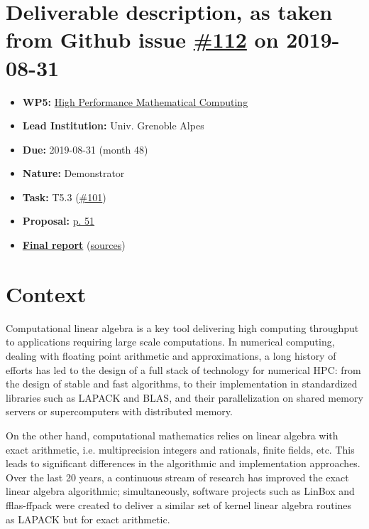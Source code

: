 \hypertarget{deliverable-description-as-taken-from-github-issue-112-on-2019-08-31}{%
\section*{\texorpdfstring{Deliverable description, as taken from Github
issue
\href{https://github.com/OpenDreamKit/OpenDreamKit/issues/112}{\#112} on
2019-08-31}{Deliverable description, as taken from Github issue \#112 on 2019-08-31}}\label{deliverable-description-as-taken-from-github-issue-112-on-2019-08-31}}

\begin{itemize}
\tightlist
\item
  \textbf{WP5:}
  \href{https://github.com/OpenDreamKit/OpenDreamKit/tree/master/WP5}{High
  Performance Mathematical Computing}
\item
  \textbf{Lead Institution:} Univ. Grenoble Alpes
\item
  \textbf{Due:} 2019-08-31 (month 48)
\item
  \textbf{Nature:} Demonstrator
\item
  \textbf{Task:} T5.3
  (\href{https://github.com/OpenDreamKit/OpenDreamKit/issues/101}{\#101})
\item
  \textbf{Proposal:}
  \href{https://github.com/OpenDreamKit/OpenDreamKit/raw/master/Proposal/proposal-www.pdf}{p.
  51}
\item
  \textbf{\href{https://github.com/OpenDreamKit/OpenDreamKit/raw/master/WP5/D5.14/report-final.pdf}{Final
  report}}
  (\href{https://github.com/OpenDreamKit/OpenDreamKit/raw/master/WP5/D5.14/}{sources})
\end{itemize}

\hypertarget{context}{%
\section*{Context}\label{context}}

Computational linear algebra is a key tool delivering high computing
throughput to applications requiring large scale computations. In
numerical computing, dealing with floating point arithmetic and
approximations, a long history of efforts has led to the design of a
full stack of technology for numerical HPC: from the design of stable
and fast algorithms, to their implementation in standardized libraries
such as LAPACK and BLAS, and their parallelization on shared memory
servers or supercomputers with distributed memory.

On the other hand, computational mathematics relies on linear algebra
with exact arithmetic, i.e. multiprecision integers and rationals,
finite fields, etc. This leads to significant differences in the
algorithmic and implementation approaches. Over the last 20 years, a
continuous stream of research has improved the exact linear algebra
algorithmic; simultaneously, software projects such as LinBox and
fflas-ffpack were created to deliver a similar set of kernel linear
algebra routines as LAPACK but for exact arithmetic.

